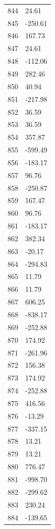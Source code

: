 \documentclass[a4paper,11pt]{article}
\begin{document}
\begin{center}
\begin{longtable}{|R{1.5cm}|R{2.5cm}|}
  844 &        24.61 \\
  845 &      -250.61 \\
  846 &       167.73 \\
  847 &        24.61 \\
  848 &      -112.06 \\
  849 &       282.46 \\
  850 &        40.94 \\
  851 &      -217.98 \\
  852 &        36.59 \\
  853 &        36.59 \\
  854 &       357.87 \\
  855 &      -599.49 \\
  856 &      -183.17 \\
  857 &        96.76 \\
  858 &      -250.87 \\
  859 &       167.47 \\
  860 &        96.76 \\
  861 &      -183.17 \\
  862 &       382.34 \\
  863 &       -20.17 \\
  864 &      -294.83 \\
  865 &        11.79 \\
  866 &        11.79 \\
  867 &       606.25 \\
  868 &      -838.17 \\
  869 &      -252.88 \\
  870 &       174.92 \\
  871 &      -261.96 \\
  872 &       156.38 \\
  873 &       174.92 \\
  874 &      -252.88 \\
  875 &       416.56 \\
  876 &       -13.29 \\
  877 &      -337.15 \\
  878 &        13.21 \\
  879 &        13.21 \\
  880 &       776.47 \\
  881 &      -998.70 \\
  882 &      -299.62 \\
  883 &       230.24 \\
  884 &      -139.65 \\

\end{longtable}
\end{center}
\end{document}
